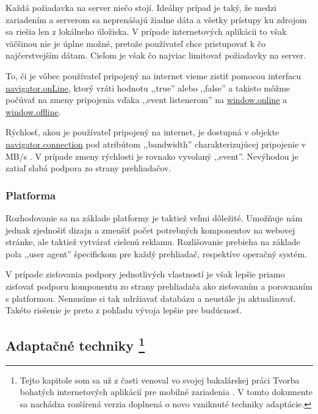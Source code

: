 Každá požiadavka na server niečo stojí. Ideálny prípad je taký, že medzi zariadením a serverom sa neprenášajú žiadne dáta a všetky prístupy ku zdrojom sa riešia len z lokálneho úložiska. V prípade internetových aplikácii to však väčšinou nie je úplne možné, pretože používateľ chce pristupovať k čo najčerstvejším dátam. Cieľom je však čo najviac limitovať požiadavky na server.

To, či je vôbec používateľ pripojený na internet vieme zistiť pomocou interfacu \url{navigator.onLine}, ktorý vráti hodnotu ,,true'' alebo ,,false'' a takisto môžme počúvať na zmeny pripojenia vďaka ,,event listenerom'' na \url{window.online} a \url{window.offline}.

Rýchlosť, akou je používateľ pripojený na internet, je dostupná v objekte \url{navigator.connection} pod atribútom ,,bandwidth'' charakterizujúcej pripojenie v MB/s \cite{network}. V prípade zmeny rýchlosti je rovnako vyvolaný ,,event''. Nevýhodou je zatiaľ slabá podpora zo strany prehliadačov.


\newpage
\subsubsection{Platforma} %
\label{ssub:platforma}

Rozhodovanie sa na základe platformy je taktiež veľmi dôležité. Umožňuje nám jednak zjednošiť dizajn a zmenšiť počet potrebných komponentov na webovej stránke, ale taktiež vytvárať cielenú reklamu. Rozlišovanie prebieha na základe pola ,,user agent'' špecifickom pre každý prehliadač, respektíve operačný systém.

V prípade zisťovania podpory jednotlivých vlastností je však lepšie priamo zisťovať podporu komponentu zo strany prehliadača ako zisťovaním a porovnaním s platformou. Nemusíme si tak udržiavať databázu a neustále ju aktualizovať. Takéto riešenie je preto z pohľadu vývoja lepšie pre budúcnosť.




\subsection{Adaptačné techniky \footnote{Tejto kapitole som sa už z časti venoval vo svojej bakalárskej práci Tvorba bohatých internetových aplikácií pre mobilné zariadenia \cite{ja}. V tomto dokumente sa nachádza rozšírená verzia doplnená o novo vzniknuté techniky adaptácie.}} %
\label{sub:adapta_n_techniky}

